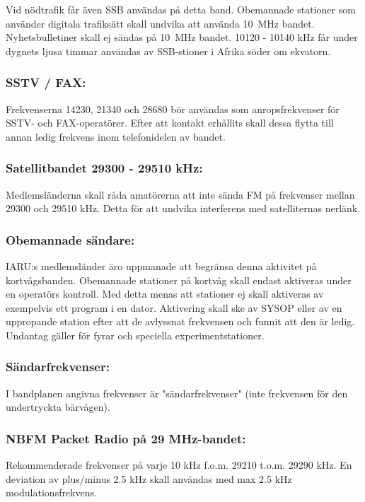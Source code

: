 Vid nödtrafik får även SSB användas på detta band. Obemannade
stationer som använder digitala trafiksätt skall undvika att
använda 10~MHz bandet.
Nyhetsbulletiner skall ej sändas på 10~MHz bandet.
10120 - 10140 kHz får under dygnets ljusa timmar användas av
SSB-stioner i Afrika söder om ekvatorn.

\subsubsection{SSTV / FAX:}

Frekvenserna 14230, 21340 och 28680 bör användas
som anropsfrekvenser för SSTV- och FAX-operatörer.
Efter att kontakt erhållits skall dessa flytta till annan
ledig frekvens inom telefonidelen av bandet.

\subsubsection{Satellitbandet 29300 - 29510 kHz:}

Medlemsländerna skall råda amatörerna att inte sända
FM på frekvenser mellan 29300 och 29510 kHz. Detta
för att undvika interferens med satelliternas nerlänk.

\subsubsection{Obemannade sändare:}

IARU:s medlemsländer äro uppmanade att begränsa
denna aktivitet på kortvågsbanden.
Obemannade stationer på kortvåg skall endast aktiveras under en operatörs kontroll.
Med detta menas att stationer ej skall aktiveras av
exempelvis ett program i en dator. Aktivering skall ske
av SYSOP eller av en uppropande station efter att de
avlyssnat frekvensen och funnit att den är ledig.
Undantag gäller för fyrar och speciella experimentstationer.

\subsubsection{Sändarfrekvenser:}

I bandplanen angivna frekvenser är "sändarfrekvenser"
(inte frekvensen för den undertryckta bärvågen).

\subsubsection{NBFM Packet Radio på 29 MHz-bandet:}

Rekommenderade frekvenser på varje 10 kHz f.o.m.
29210 t.o.m. 29290 kHz. En deviation av plus/minus 2.5
kHz skall användas med max 2.5 kHz modulationsfrekvens.
